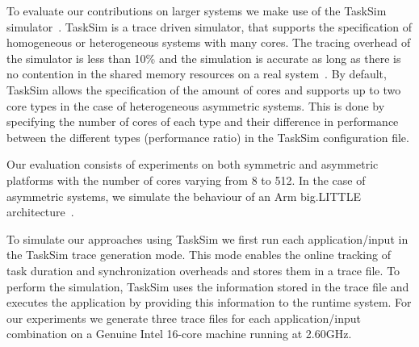 
To evaluate our contributions on larger systems we make use of the TaskSim simulator~\cite{AbstrLevels_TACO12,MUSA}. 
TaskSim is a trace driven simulator, that supports the specification of homogeneous or heterogeneous systems with many cores. 
The tracing overhead of the simulator is less than 10\% and the simulation is accurate as long as there is no contention in the shared memory resources on a real system~\cite{MUSA}.
By default, TaskSim allows the specification of the amount of cores and supports up to two core types in the case of heterogeneous asymmetric systems. 
This is done by specifying the number of cores of each type and their difference in performance between the different types (performance ratio) in the TaskSim configuration file.

Our evaluation consists of experiments on both symmetric and asymmetric platforms with the number of cores varying from 8 to 512.
In the case of asymmetric systems, we simulate the behaviour of an Arm big.LITTLE architecture~\cite{ARM}.




To simulate our approaches using TaskSim we first run each application/input in the TaskSim trace generation mode.
This mode enables the online tracking of task duration and synchronization overheads and stores them in a trace file. 
To perform the simulation, TaskSim uses the information stored in the trace file and executes the application by providing this information to the runtime system.
For our experiments we generate three trace files for each application/input combination on a Genuine Intel 16-core machine running at 2.60GHz.